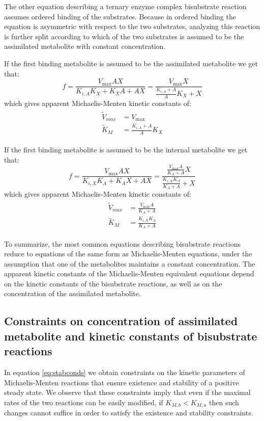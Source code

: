   The other equation describing a ternary enzyme complex  bisubstrate reaction assumes ordered binding of the substrates.
  Because in ordered binding the equation is asymmetric with respect to the two substrates, analyzing this reaction is further split according to which of the two substrates is assumed to be the assimilated metabolite with constant concentration.

  If the first binding metabolite is assumed to be the assimilated metabolite we get that:
  \begin{equation}
      \label{eq:biordfstmm}
      f=\frac{V_{\max}AX}{K_{i,A}K_X+K_XA+AX}=\frac{V_{\max}X}{\frac{K_{i,A}+A}{A}K_X+X}
  \end{equation}
  which gives apparent Michaelis-Menten kinetic constants of:
  \begin{align}
  \begin{split}
      \label{eq:paramsasymfst}
      \tilde{V}_{max}&=V_{\max} \\
      \tilde{K}_M&=\frac{K_{i,A}+A}{A}K_X
  \end{split}
  \end{align}

  If the first binding metabolite is assumed to be the internal metabolite we get that:
  \begin{equation}
      \label{eq:biordsndmm}
      f=\frac{V_{\max}AX}{K_{i,X}K_A+K_AX+AX}=\frac{\frac{V_{\max}A}{K_A+A}X}{\frac{K_{i,X}K_A}{K_A+A}+X}
  \end{equation}
  which gives apparent Michaelis-Menten kinetic constants of:
  \begin{align}
  \begin{split}
      \label{eq:paramsasymsnd}
      \tilde{V}_{max}&=\frac{V_{\max}A}{K_A+A} \\
      \tilde{K}_M&=\frac{K_{i,X}K_A}{K_A+A}
  \end{split}
  \end{align}

  To summarize, the most common equations describing bisubstrate reactions reduce to equations of the same form as Michaelis-Menten equations, under the assumption that one of the metabolites maintains a constant concentration.
  The apparent kinetic constants of the Michaelis-Menten equivalent equations depend on the kinetic constants of the bisubstrate reactions, as well as on the concentration of the assimilated metabolite.

  \label{sec:bisubstrateconstants}
  \subsection{Constraints on concentration of assimilated metabolite and kinetic constants of bisubstrate reactions}
  In equation \ref{eq:stabconds} we obtain constraints on the kinetic parameters of Michaelis-Menten reactions that ensure existence and stability of a positive steady state.
  We observe that these constraints imply that even if the maximal rates of the two reactions can be easily modified, if $K_{M,b}<K_{M,a}$ then such changes cannot suffice in order to satisfy the existence and stability constraints.

